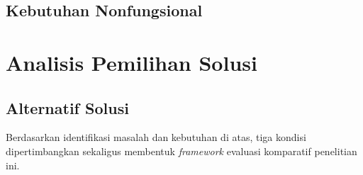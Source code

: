 \subsection{Kebutuhan Nonfungsional}
\label{subsec:kebutuhan-nonfungsional}

\section{Analisis Pemilihan Solusi}
\label{sec:analisis-solusi}

\subsection{Alternatif Solusi}
\label{subsec:alternatif-solusi}

Berdasarkan identifikasi masalah dan kebutuhan di atas, tiga kondisi dipertimbangkan sekaligus membentuk \emph{framework} evaluasi
komparatif penelitian ini.

